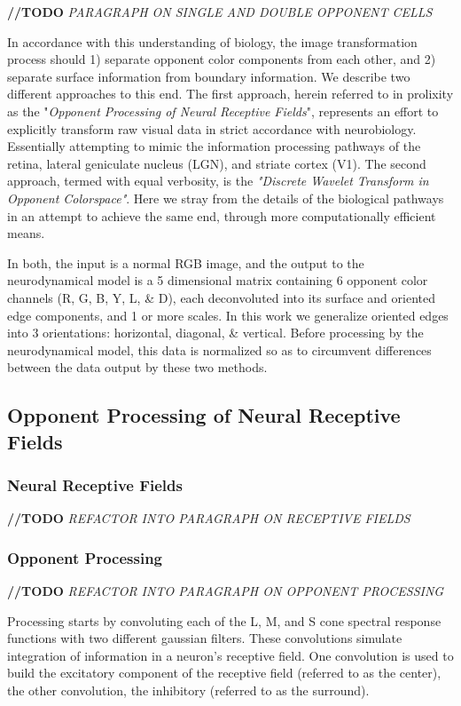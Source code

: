 \documentclass[journal,onecolumn]{IEEEtran}
\begin{document}
\textbf{//TODO} \textit{PARAGRAPH ON SINGLE AND DOUBLE OPPONENT CELLS}

In accordance with this understanding of biology, the image transformation process should 1) separate opponent color components from each other, and 2) separate surface information from boundary information. We describe two different approaches to this end. The first approach, herein referred to in prolixity as the "\textit{Opponent Processing of Neural Receptive Fields}", represents an effort to explicitly transform raw visual data in strict accordance with neurobiology. Essentially attempting to mimic the information processing pathways of the retina, lateral geniculate nucleus (LGN), and striate cortex (V1). The second approach, termed with equal verbosity, is the \textit{"Discrete Wavelet Transform in Opponent Colorspace"}. Here we stray from the details of the biological pathways in an attempt to achieve the same end, through more computationally efficient means.

In both, the input is a normal RGB image, and the output to the neurodynamical model is a 5 dimensional matrix containing 6 opponent color channels (R, G, B, Y, L, \& D), each deconvoluted into its surface and oriented edge components, and 1 or more scales. In this work we generalize oriented edges into 3 orientations: horizontal, diagonal, \& vertical. Before processing by the neurodynamical model, this data is normalized so as to circumvent differences between the data output by these two methods.

\subsection{Opponent Processing of Neural Receptive Fields}

\subsubsection*{Neural Receptive Fields}

\textbf{//TODO} \textit{REFACTOR INTO PARAGRAPH ON RECEPTIVE FIELDS}

\subsubsection*{Opponent Processing}

\textbf{//TODO} \textit{REFACTOR INTO PARAGRAPH ON OPPONENT PROCESSING}


Processing starts by convoluting each of the L, M, and S cone spectral response functions with two different gaussian filters. These convolutions simulate integration of information in a neuron's receptive field. One convolution is used to build the excitatory component of the receptive field (referred to as the center), the other convolution, the inhibitory (referred to as the surround).
\end{document}
